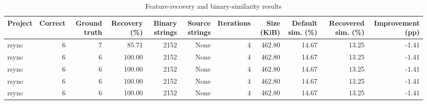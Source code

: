 \begin{table}[htbp]
\centering
\caption{Feature-recovery and binary-similarity results}
\label{tab:feature-recovery-results}
\small
\begin{tabular}{lrrrrrrrrrr}
\toprule
Project & Correct & Ground truth & Recovery (\%) & Binary strings & Source strings & Iterations & Size (KiB) & Default sim. (\%) & Recovered sim. (\%) & Improvement (pp) \\
\midrule
rsync & 6 & 7 & 85.71 & 2152 & None & 4 & 462.80 & 14.67 & 13.25 & -1.41 \\
rsync & 6 & 6 & 100.00 & 2152 & None & 4 & 462.80 & 14.67 & 13.25 & -1.41 \\
rsync & 6 & 6 & 100.00 & 2152 & None & 4 & 462.80 & 14.67 & 13.25 & -1.41 \\
rsync & 6 & 6 & 100.00 & 2152 & None & 4 & 462.80 & 14.67 & 13.25 & -1.41 \\
rsync & 6 & 6 & 100.00 & 2152 & None & 4 & 462.80 & 14.67 & 13.25 & -1.41 \\
\bottomrule
\end{tabular}
\end{table}
